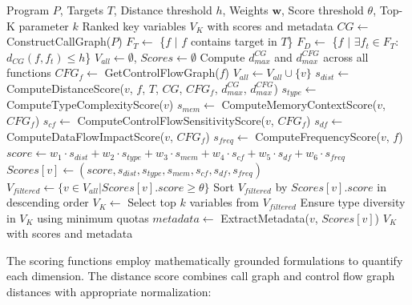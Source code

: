 \documentclass[review]{elsarticle}
\begin{document}
\begin{algorithm}[t]
\caption{Multi-Dimensional Key Variable Identification with Scoring}
\label{alg:key-vars}
\begin{algorithmic}[1]
\REQUIRE Program $P$, Targets $T$, Distance threshold $h$, Weights $\mathbf{w}$, Score threshold $\theta$, Top-K parameter $k$
\ENSURE Ranked key variables $V_K$ with scores and metadata
\STATE $CG \leftarrow$ ConstructCallGraph($P$)
\STATE $F_T \leftarrow$ \{$f$ $|$ $f$ contains target in $T$\}
\STATE $F_D \leftarrow$ \{$f$ $|$ $\exists f_t \in F_T$: $d_{CG}(f, f_t) \leq h$\}
\STATE $V_{all} \leftarrow \emptyset$, $Scores \leftarrow \emptyset$
\STATE Compute $d_{max}^{CG}$ and $d_{max}^{CFG}$ across all functions
    \STATE $CFG_f \leftarrow$ GetControlFlowGraph($f$)
        \STATE $V_{all} \leftarrow V_{all} \cup \{v\}$
        \STATE {}
        \STATE $s_{dist} \leftarrow$ ComputeDistanceScore($v$, $f$, $T$, $CG$, $CFG_f$, $d_{max}^{CG}$, $d_{max}^{CFG}$)
        \STATE $s_{type} \leftarrow$ ComputeTypeComplexityScore($v$)
        \STATE $s_{mem} \leftarrow$ ComputeMemoryContextScore($v$, $CFG_f$)
        \STATE $s_{cf} \leftarrow$ ComputeControlFlowSensitivityScore($v$, $CFG_f$)
        \STATE $s_{df} \leftarrow$ ComputeDataFlowImpactScore($v$, $CFG_f$)
        \STATE $s_{freq} \leftarrow$ ComputeFrequencyScore($v$, $f$)
        \STATE {}
        \STATE $score \leftarrow w_1 \cdot s_{dist} + w_2 \cdot s_{type} + w_3 \cdot s_{mem} + w_4 \cdot s_{cf} + w_5 \cdot s_{df} + w_6 \cdot s_{freq}$
        \STATE $Scores[v] \leftarrow (score, s_{dist}, s_{type}, s_{mem}, s_{cf}, s_{df}, s_{freq})$
    \ENDFOR
\ENDFOR
\STATE {}
\STATE $V_{filtered} \leftarrow \{v \in V_{all} | Scores[v].score \geq \theta\}$
\STATE Sort $V_{filtered}$ by $Scores[v].score$ in descending order
\STATE $V_K \leftarrow$ Select top $k$ variables from $V_{filtered}$
\STATE Ensure type diversity in $V_K$ using minimum quotas
    \STATE $metadata \leftarrow$ ExtractMetadata($v$, $Scores[v]$)
\ENDFOR
\RETURN $V_K$ with scores and metadata
\end{algorithmic}
\end{algorithm}

The scoring functions employ mathematically grounded formulations to quantify each dimension. The distance score combines call graph and control flow graph distances with appropriate normalization:
\end{document}
